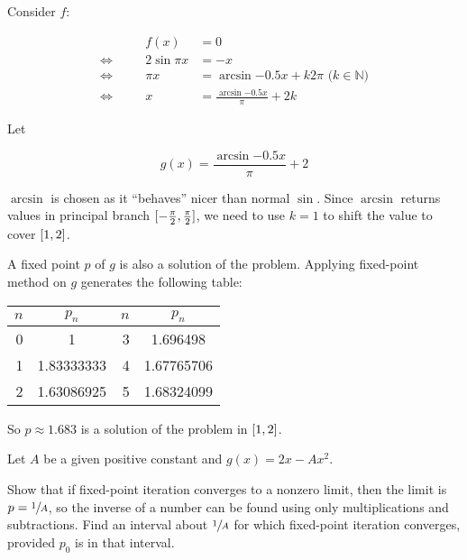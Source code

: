 \documentclass[../../../../Assignments]{subfiles}
\begin{document}
\begin{solution}
    Consider \(f\):

    \begin{align*}
        &\quad&         f(x) &= 0 \\
        \iff&& 2 \sin{\pi x} &= -x \\
        \iff&&         \pi x &= \arcsin{\num{-0.5} x} + k 2 \pi \text{ (\(k \in \mathbb{N}\))} \\
        \iff&&             x &= \frac{\arcsin{\num{-0.5} x}}{\pi} + 2k
    \end{align*}

    Let

    \[g(x) = \frac{\arcsin\num{-0.5} x}{\pi} + 2\]

    \(\arcsin\) is chosen as it ``behaves'' nicer than normal \(\sin\). Since
    \(\arcsin\) returns values in principal branch
    \(\interval{-\frac{\pi}{2}}{\frac{\pi}{2}}\), we need to use \(k = 1\) to
    shift the value to cover \(\interval{1}{2}\).

    A fixed point \(p\) of \(g\) is also a solution of the problem. Applying
    fixed-point method on \(g\) generates the following table:

    \begin{table}[H]
        \centering
        \begin{tabular}{r S[table-format=1.8] r S[table-format=1.8]}
            \toprule
            \(n\)  &   {\(p_n\)}   &  \(n\)  &   {\(p_n\)}   \\
              &  1            &      3  &  1.696498     \\
                1  &  1.83333333   &      4  &  1.67765706   \\
                2  &  1.63086925   &      5  &  1.68324099   \\
            \bottomrule
        \end{tabular}
    \end{table}

    So \(p \approx \num{1.683}\) is a solution of the problem in
    \(\interval{1}{2}\).

\end{solution}

\begin{exercise}
    Let \(A\) be a given positive constant and \(g(x) = 2x - Ax^2\).

    \begin{tasks}
        \task Show that if fixed-point iteration converges to a nonzero limit,
            then the limit is \(p = \sfrac{1}{A}\), so the inverse of a number
            can be found using only multiplications and subtractions.
        \task Find an interval about \(\sfrac{1}{A}\) for which fixed-point
            iteration converges, provided \(p_0\) is in that interval.
    \end{tasks}
\end{exercise}
\end{document}
